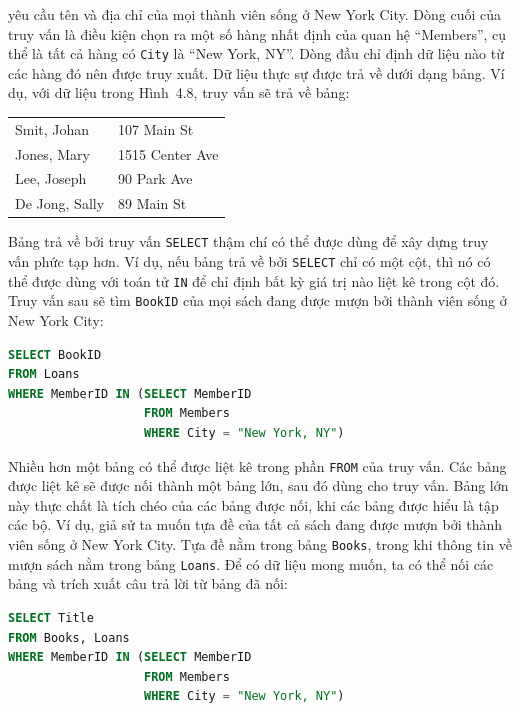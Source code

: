 yêu cầu tên và địa chỉ của mọi thành viên sống ở New York City. Dòng cuối của truy vấn là điều kiện chọn ra một số hàng nhất định của quan hệ ``Members'', cụ thể là tất cả hàng có \texttt{City} là ``New York, NY''. Dòng đầu chỉ định dữ liệu nào từ các hàng đó nên được truy xuất. Dữ liệu thực sự được trả về dưới dạng bảng. Ví dụ, với dữ liệu trong Hình~4.8, truy vấn sẽ trả về bảng:

\begin{center}
\begin{tabular}{ll}
\toprule
Smit, Johan & 107 Main St \\
Jones, Mary & 1515 Center Ave \\
Lee, Joseph & 90 Park Ave \\
De Jong, Sally & 89 Main St \\
\bottomrule
\end{tabular}
\end{center}

Bảng trả về bởi truy vấn \texttt{SELECT} thậm chí có thể được dùng để xây dựng truy vấn phức tạp hơn. Ví dụ, nếu bảng trả về bởi \texttt{SELECT} chỉ có một cột, thì nó có thể được dùng với toán tử \texttt{IN} để chỉ định bất kỳ giá trị nào liệt kê trong cột đó. Truy vấn sau sẽ tìm \texttt{BookID} của mọi sách đang được mượn bởi thành viên sống ở New York City:

\begin{lstlisting}[language=SQL]
SELECT BookID
FROM Loans
WHERE MemberID IN (SELECT MemberID
                   FROM Members
                   WHERE City = "New York, NY")
\end{lstlisting}

Nhiều hơn một bảng có thể được liệt kê trong phần \texttt{FROM} của truy vấn. Các bảng được liệt kê sẽ được nối thành một bảng lớn, sau đó dùng cho truy vấn. Bảng lớn này thực chất là tích chéo của các bảng được nối, khi các bảng được hiểu là tập các bộ. Ví dụ, giả sử ta muốn tựa đề của tất cả sách đang được mượn bởi thành viên sống ở New York City. Tựa đề nằm trong bảng \texttt{Books}, trong khi thông tin về mượn sách nằm trong bảng \texttt{Loans}. Để có dữ liệu mong muốn, ta có thể nối các bảng và trích xuất câu trả lời từ bảng đã nối:

\begin{lstlisting}[language=SQL]
SELECT Title
FROM Books, Loans
WHERE MemberID IN (SELECT MemberID
                   FROM Members
                   WHERE City = "New York, NY")
\end{lstlisting}

